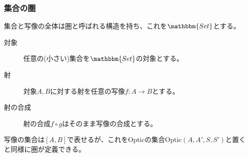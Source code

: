 \documentclass[uplatex,dvipdfmx]{beamer}
\newcommand{\cat}[1]{\mathbbm{#1}}
\newcommand{\arrow}{\rightarrow}
\newcommand{\mor}[3]{#1:#2\arrow #3}
\newcommand{\inset}[2]{[#1,#2]}
\begin{document}
  \begin{frame}
    \frametitle{集合の圏}
    集合と写像の全体は圏と呼ばれる構造を持ち、これを$\cat{Set}$とする。\\
    \vspace{\baselineskip}
    \begin{definition}[集合の圏]
      {\small
      \begin{description}
        \item[対象] 任意の(小さい)集合を$\cat{Set}$の対象とする。
        \item[射] 対象$A,B$に対する射を任意の写像$\mor{f}{A}{B}$とする。
        \item[射の合成] 射の合成$f\circ g$はそのまま写像の合成とする。
      \end{description}
    }
    \end{definition}
  \vspace{\baselineskip}

  写像の集合は$\inset{A}{B}$で表せるが、これをOpticの集合$\mathrm{Optic}(A,A',S,S')$と置くと同様に圏が定義できる。
  \end{frame}
\end{document}
